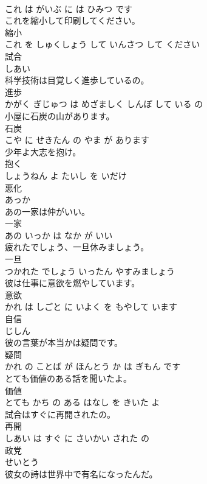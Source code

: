 \documentclass[8pt]{extreport}
\begin{document}
\begin{CJK}{UTF8}{min}
\\	これ は がいぶ に は ひみつ です			
\\	これを縮小して印刷してください。	
\\	縮小 
\\	これ を しゅくしょう して いんさつ して ください			
\\	試合	
\\	しあい			
\\	科学技術は目覚しく進歩しているの。	
\\	進歩 
\\	かがく ぎじゅつ は めざましく しんぽ して いる の			
\\	小屋に石炭の山があります。	
\\	石炭 
\\	こや に せきたん の やま が あります			
\\	少年よ大志を抱け。	
\\	抱く 
\\	しょうねん よ たいし を いだけ			
\\	悪化	
\\	あっか			
\\	あの一家は仲がいい。	
\\	一家 
\\	あの いっか は なか が いい			
\\	疲れたでしょう、一旦休みましょう。	
\\	一旦 
\\	つかれた でしょう いったん やすみましょう			
\\	彼は仕事に意欲を燃やしています。	
\\	意欲 
\\	かれ は しごと に いよく を もやして います			
\\	自信	
\\	じしん			
\\	彼の言葉が本当かは疑問です。	
\\	疑問 
\\	かれ の ことば が ほんとう か は ぎもん です			
\\	とても価値のある話を聞いたよ。	
\\	価値 
\\	とても かち の ある はなし を きいた よ			
\\	試合はすぐに再開されたの。	
\\	再開 
\\	しあい は すぐ に さいかい された の			
\\	政党	
\\	せいとう			
\\	彼女の詩は世界中で有名になったんだ。	

\end{CJK}
\end{document}
